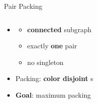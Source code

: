 \begin{frame}{Pair Packing}
\begin{columns}[T]
\begin{column}{.63\linewidth}
\begin{itemize}

\item<1->\alert{\Pack{}} 
	\begin{itemize}
	\item<2->
	\textbf{connected} subgraph
	\item<3->
	exactly \textbf{one} pair
	\item<4->
	no singleton
	\end{itemize}

\item<6->
\alert{Packing}: \textbf{color disjoint} \pack{}s

\item<8->
\textbf{Goal}: maximum packing 


\end{itemize}
\end{column}
\hfill
\begin{column}{.37\linewidth}
\end{column}
\end{columns}
\end{frame}